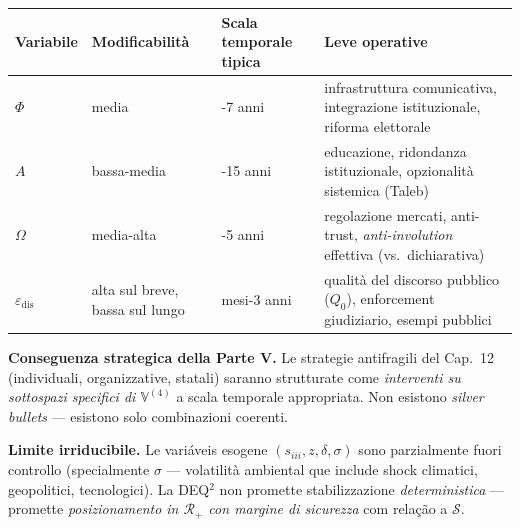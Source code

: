 {\def\LTcaptype{none} %
{\small\begin{longtable}[]{@{}
  >{\raggedright\arraybackslash}p{}
  >{\raggedright\arraybackslash}p{}
  >{\raggedright\arraybackslash}p{}
  >{\raggedright\arraybackslash}p{}@{}}
\toprule\noalign{}
\begin{minipage}[b]{\linewidth}\raggedright
Variabile
\end{minipage} & \begin{minipage}[b]{\linewidth}\raggedright
Modificabilità
\end{minipage} & \begin{minipage}[b]{\linewidth}\raggedright
Scala temporale tipica
\end{minipage} & \begin{minipage}[b]{\linewidth}\raggedright
Leve operative
\end{minipage} \\
\midrule\noalign{}
\endhead
\bottomrule\noalign{}
\endlastfoot
\(\Phi\) & media & 3-7 anni & infrastruttura comunicativa, integrazione
istituzionale, riforma elettorale \\
\(A\) & bassa-media & 5-15 anni & educazione, ridondanza istituzionale,
opzionalità sistemica (Taleb) \\
\(\Omega\) & media-alta & 1-5 anni & regolazione mercati, anti-trust,
\emph{anti-involution} effettiva (vs.~dichiarativa) \\
\(\varepsilon_{\text{dis}}\) & alta sul breve, bassa sul lungo & 6
mesi-3 anni & qualità del discorso pubblico (\(Q_0\)), enforcement
giudiziario, esempi pubblici \\
\end{longtable}}
}

\Proved{} \textbf{Conseguenza strategica della Parte V.} Le strategie
antifragili del Cap.~12 (individuali, organizzative, statali) saranno
strutturate come \emph{interventi su sottospazi specifici di
\(\mathbb{V}^{(4)}\)} a scala temporale appropriata. Non esistono
\emph{silver bullets} --- esistono solo combinazioni coerenti.

\Conj{} \textbf{Limite irriducibile.} Le variáveis esogene
\((s_{iii}, z, \delta, \sigma)\) sono parzialmente fuori controllo
(specialmente \(\sigma\) --- volatilità ambiental que include shock
climatici, geopolitici, tecnologici). La DEQ$^2$ non promette
stabilizzazione \emph{deterministica} --- promette \emph{posizionamento
in \(\mathcal{R}_+\) con margine di sicurezza} com relação a
\(\mathcal{S}\).



